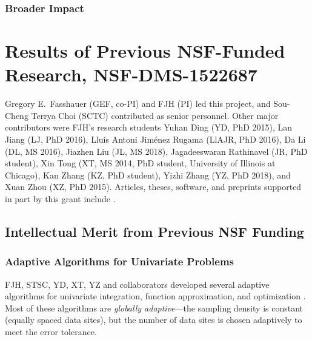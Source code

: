 \documentclass[11pt]{NSFamsart}
\begin{document}
\subsubsection{Broader Impact}



\section{Results of Previous NSF-Funded Research,
NSF-DMS-1522687} \label{sec:Previous}

Gregory E.\ Fasshauer (GEF, co-PI) and FJH (PI) led this project, and Sou-Cheng Terrya Choi (SCTC) contributed as senior personnel.  Other major contributors were FJH's research students Yuhan Ding (YD, PhD 2015), Lan Jiang (LJ, PhD 2016), 
Llu\'is Antoni Jim\'enez Rugama (LlAJR, PhD 2016), Da Li (DL, MS 2016), Jiazhen Liu (JL, MS 2018), Jagadeeswaran Rathinavel (JR, 
PhD student), Xin Tong (XT, MS 2014, PhD student, University of Illinois at Chicago), Kan Zhang (KZ, PhD student), Yizhi Zhang (YZ, PhD 2018), and Xuan Zhou (XZ, PhD 2015).  Articles, theses,  
software, and preprints supported in 
part by this 
grant 
include 
\cite{ala_augmented_2017, 
	ChoEtal17a,
	ChoEtal17b,
	Din15a, 
	DinHic20a,
	GilEtal16a,
	Hic17a,
	HicJag18b,
	HicJim16a,
	HicEtal18a,
	HicEtal17a,
	HicKriWoz19a,
	RatHic19a,
	GilJim16b,
	JimHic16a,
	JohFasHic18a,
	Li16a,
	Liu17a,
	MarEtal18a,
	mccourt_stable_2017,
	MCCEtal19a,
	mishra_hybrid_2018,
	MisEtal19a,
	rashidinia_stable_2016,
	rashidinia_stable_2018,
	Zha18a,
	Zha17a,
	Zho15a,
	ZhoHic15a}.

\subsection{Intellectual Merit from Previous NSF Funding}
\label{previousmeritsubsec}

\subsubsection{Adaptive Algorithms for Univariate Problems} \label{sec:localadpat}
FJH, STSC, YD, XT, YZ and collaborators developed several adaptive algorithms for univariate integration, function approximation, and optimization \cite{ChoEtal17a,HicEtal14b,  Din15a, Ton14a, Zha18a}.  Most of these algorithms are \emph{globally adaptive}---the sampling density is constant (equally spaced data sites), but the number of data sites is chosen adaptively to meet the error tolerance.
\end{document}
